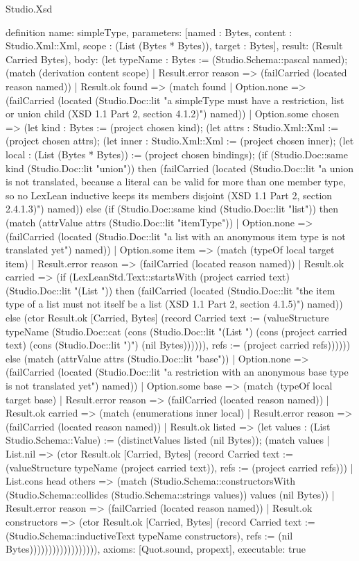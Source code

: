 \begin{lexlean}{Studio.Xsd}
\begin{semanticmodule}
definition{
  name: simpleType,
  parameters: [named : Bytes, content : Studio.Xml::Xml, scope : (List (Bytes * Bytes)), target : Bytes],
  result: (Result Carried Bytes),
  body: (let typeName : Bytes := (Studio.Schema::pascal named); (match (derivation content scope)
    | Result.error reason => (failCarried (located reason named))
    | Result.ok found => (match found
      | Option.none => (failCarried (located (Studio.Doc::lit "a simpleType must have a restriction, list or union child (XSD 1.1 Part 2, section 4.1.2)") named))
      | Option.some chosen => (let kind : Bytes := (project chosen kind); (let attrs : Studio.Xml::Xml := (project chosen attrs); (let inner : Studio.Xml::Xml := (project chosen inner); (let local : (List (Bytes * Bytes)) := (project chosen bindings); (if (Studio.Doc::same kind (Studio.Doc::lit "union")) then (failCarried (located (Studio.Doc::lit "a union is not translated, because a literal can be valid for more than one member type, so no LexLean inductive keeps its members disjoint (XSD 1.1 Part 2, section 2.4.1.3)") named)) else (if (Studio.Doc::same kind (Studio.Doc::lit "list")) then (match (attrValue attrs (Studio.Doc::lit "itemType"))
        | Option.none => (failCarried (located (Studio.Doc::lit "a list with an anonymous item type is not translated yet") named))
        | Option.some item => (match (typeOf local target item)
          | Result.error reason => (failCarried (located reason named))
          | Result.ok carried => (if (LexLeanStd.Text::startsWith (project carried text) (Studio.Doc::lit "(List ")) then (failCarried (located (Studio.Doc::lit "the item type of a list must not itself be a list (XSD 1.1 Part 2, section 4.1.5)") named)) else (ctor Result.ok [Carried, Bytes] (record Carried {text := (valueStructure typeName (Studio.Doc::cat (cons (Studio.Doc::lit "(List ") (cons (project carried text) (cons (Studio.Doc::lit ")") (nil Bytes)))))), refs := (project carried refs)}))))) else (match (attrValue attrs (Studio.Doc::lit "base"))
        | Option.none => (failCarried (located (Studio.Doc::lit "a restriction with an anonymous base type is not translated yet") named))
        | Option.some base => (match (typeOf local target base)
          | Result.error reason => (failCarried (located reason named))
          | Result.ok carried => (match (enumerations inner local)
            | Result.error reason => (failCarried (located reason named))
            | Result.ok listed => (let values : (List Studio.Schema::Value) := (distinctValues listed (nil Bytes)); (match values
              | List.nil => (ctor Result.ok [Carried, Bytes] (record Carried {text := (valueStructure typeName (project carried text)), refs := (project carried refs)}))
              | List.cons head others => (match (Studio.Schema::constructorsWith (Studio.Schema::collides (Studio.Schema::strings values)) values (nil Bytes))
                | Result.error reason => (failCarried (located reason named))
                | Result.ok constructors => (ctor Result.ok [Carried, Bytes] (record Carried {text := (Studio.Schema::inductiveText typeName constructors), refs := (nil Bytes)}))))))))))))))))),
  axioms: [Quot.sound, propext],
  executable: true
}


\end{semanticmodule}
\end{lexlean}
